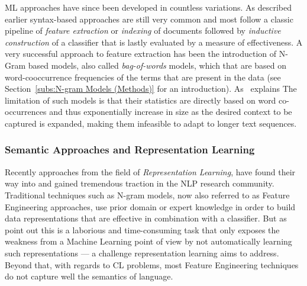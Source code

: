 \acrshort{ML} approaches have since been developed in countless variations. As described earlier syntax-based approaches are still very common and most follow a classic pipeline of \emph{feature extraction} or \emph{indexing} of documents followed by \emph{inductive construction} of a classifier that is lastly evaluated by a measure of effectiveness. A very successful approach to feature extraction has been the introduction of N-Gram based models, also called \emph{bag-of-words} models, which that are based on word-cooccurrence frequencies of the terms that are present in the data (see Section~\ref{subs:N-gram Models (Methods)} for an introduction).
As~\cite{Mikolov:2012aa} explains 
The limitation of such models is that their statistics are directly based on word co-occurrences and thus exponentially increase in size as the desired context to be captured is expanded, making them infeasible to adapt to longer text sequences.

\subsubsection*{Semantic Approaches and Representation Learning}
\label{subs:Semantic Approaches and Representation Learning}

Recently approaches from the field of \emph{Representation Learning}, have found their way into and gained tremendous traction in the \gls{NLP} research community. Traditional techniques such as N-gram models, now also referred to as \gls{Feature Engineering} approaches, use prior domain or expert knowledge in order to build data representations that are effective in combination with a classifier. But as~\cite{Bengio:2013aa} point out this is a laborious and time-consuming task that only exposes the weakness from a Machine Learning point of view by not automatically learning such representations --- a challenge representation learning aims to address. Beyond that, with regards to \gls{CL} problems, most \gls{Feature Engineering} techniques do not capture well the semantics of language.


